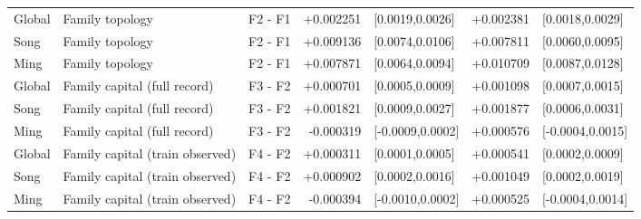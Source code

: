 \begin{longtable}{lllrlll}
Global & Family topology & F2 - F1 & +0.002251 & [0.0019,0.0026] & +0.002381 & [0.0018,0.0029] \\
Song & Family topology & F2 - F1 & +0.009136 & [0.0074,0.0106] & +0.007811 & [0.0060,0.0095] \\
Ming & Family topology & F2 - F1 & +0.007871 & [0.0064,0.0094] & +0.010709 & [0.0087,0.0128] \\
Global & Family capital (full record) & F3 - F2 & +0.000701 & [0.0005,0.0009] & +0.001098 & [0.0007,0.0015] \\
Song & Family capital (full record) & F3 - F2 & +0.001821 & [0.0009,0.0027] & +0.001877 & [0.0006,0.0031] \\
Ming & Family capital (full record) & F3 - F2 & -0.000319 & [-0.0009,0.0002] & +0.000576 & [-0.0004,0.0015] \\
Global & Family capital (train observed) & F4 - F2 & +0.000311 & [0.0001,0.0005] & +0.000541 & [0.0002,0.0009] \\
Song & Family capital (train observed) & F4 - F2 & +0.000902 & [0.0002,0.0016] & +0.001049 & [0.0002,0.0019] \\
Ming & Family capital (train observed) & F4 - F2 & -0.000394 & [-0.0010,0.0002] & +0.000525 & [-0.0004,0.0014] \\
\bottomrule
\end{longtable}
